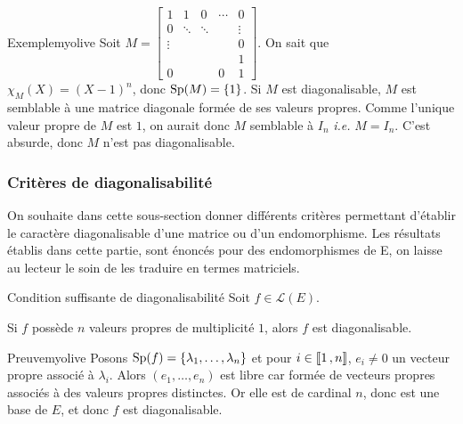     \begin{omed}{Exemple}{myolive}
        Soit $M = \begin{bmatrix}
            1 & 1 & 0 & \cdots & 0 \\
            0 & \ddots & \ddots & & \vdots \\
            \vdots & & & & 0 \\
            & & & & 1 \\
            0 & & & 0 & 1
        \end{bmatrix}$. On sait que $\chi_M(X) = (X-1)^n$, donc $\operatorname{Sp}(M) = \left\{1\right\}$. Si $M$ est diagonalisable, $M$ est semblable à une matrice diagonale formée de ses valeurs propres. Comme l’unique valeur propre de $M$ est $1$, on aurait donc $M$ semblable à $I_n$ \textit{i.e.} $M = I_n$. C’est absurde, donc $M$ n’est pas diagonalisable.
    \end{omed}

    \subsubsection{Critères de diagonalisabilité}

    On souhaite dans cette sous-section donner diﬀérents critères permettant d’établir le caractère diagonalisable d’une matrice ou d’un endomorphisme. Les résultats établis dans cette partie, sont énoncés pour des endomorphismes de E, on laisse au lecteur le soin de les traduire en termes matriciels.

    \begin{prop}{Condition suffisante de diagonalisabilité}{}
        Soit $f \in \mathcal{L}(E)$.

        Si $f$ possède $n$ valeurs propres de multiplicité $1$, alors $f$ est diagonalisable.
    \end{prop}

    \begin{demo}{Preuve}{myolive}
        Posons $\operatorname{Sp}(f) = \left\{\lambda_1,\ldots,\lambda_n\right\}$ et pour $i \in \left\llbracket 1 \, , n \right\rrbracket$, $e_i \neq 0$ un vecteur propre associé à $\lambda_i$. Alors $(e_1,\ldots,e_n)$ est libre car formée de vecteurs propres associés à des valeurs propres distinctes. Or elle est de cardinal $n$, donc est une base de $E$, et donc $f$ est diagonalisable. 
    \end{demo}

